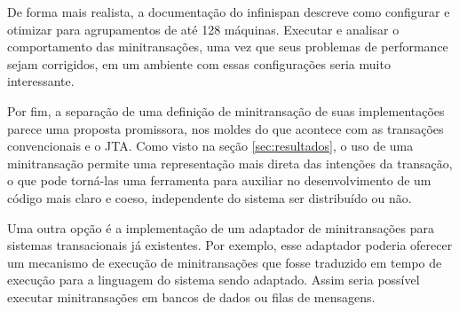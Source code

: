 \documentclass[11pt,twoside,a4paper]{book}
\renewcommand{\chaptermark}[1]{\markboth{\MakeUppercase{#1}}{}}
\begin{document}
De forma mais realista, a documentação do infinispan descreve como configurar e otimizar para agrupamentos de até 128 máquinas. Executar e analisar o comportamento das minitransações, uma vez que seus problemas de performance sejam corrigidos, em um ambiente com essas configurações seria muito interessante. 

Por fim, a separação de uma definição de minitransação de suas implementações parece uma proposta promissora, nos moldes do que acontece com as transações convencionais e o JTA. Como visto na seção \ref{sec:resultados}, o uso de uma minitransação permite uma representação mais direta das intenções da transação, o que pode torná-las uma ferramenta para auxiliar no desenvolvimento de um código mais claro e coeso, independente do sistema ser distribuído ou não.

Uma outra opção é a implementação de um adaptador de minitransações para sistemas transacionais já existentes. Por exemplo, esse adaptador poderia oferecer um mecanismo de execução de minitransações que fosse traduzido em tempo de execução para a linguagem do sistema sendo adaptado. Assim seria possível executar minitransações em bancos de dados ou filas de mensagens.




\backmatter \singlespacing   %
\end{document}
